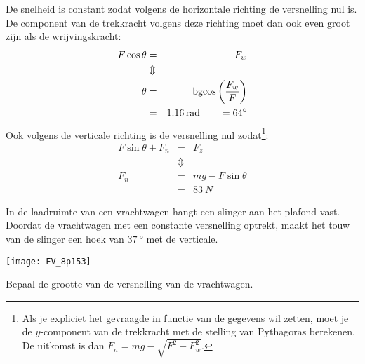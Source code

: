 \documentclass{ximera}
\begin{document}
\begin{exercise}
	\begin{oplossing}
	De snelheid is constant zodat volgens de horizontale richting de versnelling nul is. De component van de trekkracht volgens deze richting moet dan ook even groot zijn als de wrijvingskracht:
	\begin{eqnarray*}
		F\cos{\theta}&=&F_w\\
		&\Updownarrow&\\
		\theta &=& {\rm bgcos}\left(\frac{F_w}{F}\right)\\
		&=& \SI{1,16}{rad}\qquad =\SI{64}{\degree}
	\end{eqnarray*}
	Ook volgens de verticale richting is de versnelling nul zodat\footnote{Als je expliciet het gevraagde in functie van de gegevens wil zetten, moet je de $y$-component van de trekkracht met de stelling van Pythagoras berekenen. De uitkomst is dan $F_n=mg-\sqrt{F^2-F_w^2}$.}:
	\begin{eqnarray*}
		F\sin{\theta}+F_n&=&F_z\\
		&\Updownarrow&\\
		F_n &=& mg-F\sin{\theta}\\
		&=& \SI{83}{N}
	\end{eqnarray*}
	\end{oplossing}
\end{exercise}

\begin{exercise}
	In de laadruimte van een vrachtwagen hangt een slinger aan het plafond vast. Doordat de vrachtwagen met een constante versnelling optrekt, maakt het touw van de slinger een hoek van $\SI{37}{\degree}$ met de verticale. 
	
	\begin{image}
		\texttt{[image: FV\_8p153]}
	\end{image}
	
	Bepaal de grootte van de versnelling van de vrachtwagen.
\end{exercise}
\end{document}
